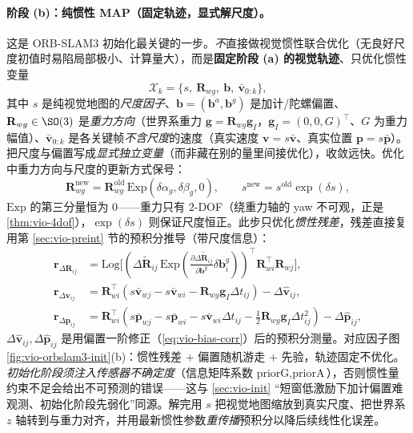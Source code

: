 \paragraph{阶段 (b)：纯惯性 MAP（固定轨迹，显式解尺度）。}
这是 ORB-SLAM3 初始化最关键的一步\cite{campos2020inertialinit}。\emph{不}直接做视觉惯性联合优化（无良好尺度初值时易陷局部极小、计算量大），而是\textbf{固定阶段 (a) 的视觉轨迹}、只优化惯性变量
\begin{equation}
  \mathcal{X}_k=\{s,\ \mathbf{R}_{wg},\ \mathbf{b},\ \bar{\mathbf{v}}_{0:k}\},
  \label{eq:vio-orbslam3-inertial-state}
\end{equation}
其中 $s$ 是纯视觉地图的\emph{尺度因子}、$\mathbf{b}=(\mathbf{b}^a,\mathbf{b}^g)$ 是加计/陀螺偏置、$\mathbf{R}_{wg}\in\SO(3)$ 是\emph{重力方向}（世界系重力 $\mathbf{g}=\mathbf{R}_{wg}\mathbf{g}_I$，$\mathbf{g}_I=(0,0,G)^\top$、$G$ 为重力幅值）、$\bar{\mathbf{v}}_{0:k}$ 是各关键帧\emph{不含尺度}的速度（真实速度 $\mathbf{v}=s\bar{\mathbf{v}}$、真实位置 $\mathbf{p}=s\bar{\mathbf{p}}$）。把尺度与偏置写成\emph{显式独立变量}（而非藏在别的量里间接优化），收敛远快。优化中重力方向与尺度的更新方式保号：
\begin{equation}
  \mathbf{R}_{wg}^{\text{new}}=\mathbf{R}_{wg}^{\text{old}}\,\mathrm{Exp}(\delta\alpha_g,\delta\beta_g,0),
  \qquad
  s^{\text{new}}=s^{\text{old}}\exp(\delta s),
  \label{eq:vio-orbslam3-grav-update}
\end{equation}
$\mathrm{Exp}$ 的第三分量恒为 $0$——重力只有 $2$-DOF（绕重力轴的 yaw 不可观，正是 \cref{thm:vio-4dof}），$\exp(\delta s)$ 则保证尺度恒正。此步只优化\emph{惯性残差}，残差直接复用第 \cref{sec:vio-preint} 节的预积分推导（带尺度信息）：
\begin{equation}
\begin{aligned}
  \mathbf{r}_{\Delta\mathbf{R}_{ij}}&=\mathrm{Log}\big[(\Delta\tilde{\mathbf{R}}_{ij}\,\mathrm{Exp}(\tfrac{\partial\Delta\tilde{\mathbf{R}}_{ij}}{\partial\mathbf{b}^g}\delta\mathbf{b}^g_i))^\top\mathbf{R}_{wi}^\top\mathbf{R}_{wj}\big],\\
  \mathbf{r}_{\Delta\mathbf{v}_{ij}}&=\mathbf{R}_{wi}^\top(s\bar{\mathbf{v}}_{wj}-s\bar{\mathbf{v}}_{wi}-\mathbf{R}_{wg}\mathbf{g}_I\Delta t_{ij})-\Delta\hat{\mathbf{v}}_{ij},\\
  \mathbf{r}_{\Delta\mathbf{p}_{ij}}&=\mathbf{R}_{wi}^\top(s\bar{\mathbf{p}}_{wj}-s\bar{\mathbf{p}}_{wi}-s\bar{\mathbf{v}}_{wi}\Delta t_{ij}-\tfrac12\mathbf{R}_{wg}\mathbf{g}_I\Delta t_{ij}^2)-\Delta\hat{\mathbf{p}}_{ij},
\end{aligned}
  \label{eq:vio-orbslam3-inertial-res}
\end{equation}
$\Delta\hat{\mathbf{v}}_{ij},\Delta\hat{\mathbf{p}}_{ij}$ 是用偏置一阶修正（\cref{eq:vio-bias-corr}）后的预积分测量。对应因子图 \cref{fig:vio-orbslam3-init}(b)：惯性残差 $+$ 偏置随机游走 $+$ 先验，轨迹固定不优化。\emph{初始化阶段须注入传感器不确定度}（信息矩阵系数 $\text{priorG},\text{priorA}$），否则惯性量约束不足会给出不可预测的错误——这与 \cref{sec:vio-init} “短窗低激励下加计偏置难观测、初始化阶段先弱化”同源。解完用 $s$ 把视觉地图缩放到真实尺度、把世界系 $z$ 轴转到与重力对齐，并用最新惯性参数\emph{重传播}预积分以降后续线性化误差。

